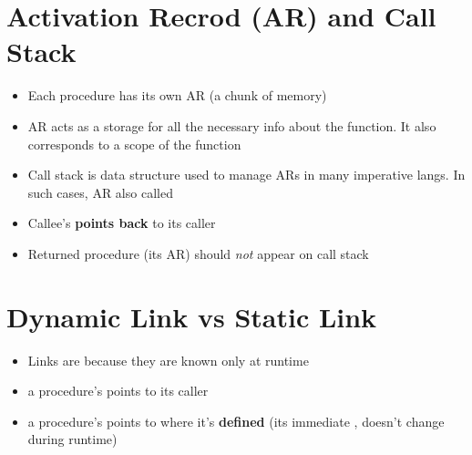 \documentclass[10pt,a4paper,landscape]{article}
\begin{document}
\pagestyle{empty}

\begin{multicols*}{3}
\section*{Activation Recrod (AR) and Call Stack}
\begin{itemize}
\item Each procedure has its own AR (a chunk of memory)
\item AR acts as a storage for all the necessary info about the function. It also corresponds to a scope of the function
\item Call stack is data structure used to manage ARs in many imperative langs. In such cases, AR also called 
\item Callee's  \textbf{points back} to its caller
\item Returned procedure (its AR) should \emph{not} appear on call stack
\end{itemize}
\section*{Dynamic Link vs Static Link}
\begin{itemize}
\item Links are  because they are known only at runtime
\item a procedure's  points to its caller
\item a procedure's  points to where it's \textbf{defined} (its immediate , doesn't change during runtime)
\end{itemize}

\end{multicols*}
\end{document}
